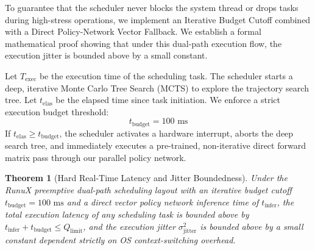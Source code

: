 \documentclass[11pt,a4paper]{book}
\newtheorem{theorem}{Theorem}
\begin{document}
To guarantee that the scheduler never blocks the system thread or drops tasks during high-stress operations, we implement an Iterative Budget Cutoff combined with a Direct Policy-Network Vector Fallback. We establish a formal mathematical proof showing that under this dual-path execution flow, the execution jitter is bounded above by a small constant.

Let $T_{\text{exec}}$ be the execution time of the scheduling task. The scheduler starts a deep, iterative Monte Carlo Tree Search (MCTS) to explore the trajectory search tree. Let $t_{\text{elas}}$ be the elapsed time since task initiation. We enforce a strict execution budget threshold:
\begin{equation}
t_{\text{budget}} = 100\text{ ms}
\end{equation}
If $t_{\text{elas}} \ge t_{\text{budget}}$, the scheduler activates a hardware interrupt, aborts the deep search tree, and immediately executes a pre-trained, non-iterative direct forward matrix pass through our parallel policy network.

\begin{theorem}[Hard Real-Time Latency and Jitter Boundedness]
Under the RunuX preemptive dual-path scheduling layout with an iterative budget cutoff $t_{\text{budget}} = 100\text{ ms}$ and a direct vector policy network inference time of $t_{\text{infer}}$, the total execution latency of any scheduling task is bounded above by $t_{\text{infer}} + t_{\text{budget}} \le Q_{\text{limit}}$, and the execution jitter $\sigma^2_{\text{jitter}}$ is bounded above by a small constant dependent strictly on OS context-switching overhead.
\end{theorem}
\end{document}

